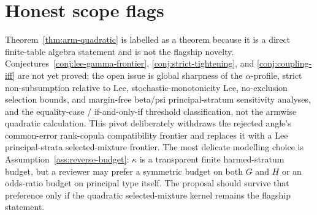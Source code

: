 \documentclass[11pt]{article}
\theoremstyle{definition}
\theoremstyle{plain}
\theoremstyle{remark}
\begin{document}
\section{Honest scope flags}
Theorem~\ref{thm:arm-quadratic} is labelled as a theorem because it is a direct finite-table algebra statement and is not the flagship novelty.  Conjectures~\ref{conj:lee-gamma-frontier}, \ref{conj:strict-tightening}, and \ref{conj:coupling-iff} are not yet proved; the open issue is global sharpness of the \(\alpha\)-profile, strict non-subsumption relative to Lee, stochastic-monotonicity Lee, no-exclusion selection bounds, and margin-free beta/psi principal-stratum sensitivity analyses, and the equality-case / if-and-only-if threshold classification, not the armwise quadratic calculation.  This pivot deliberately withdraws the rejected angle's common-error rank-copula compatibility frontier and replaces it with a Lee principal-strata selected-mixture frontier.  The most delicate modelling choice is Assumption~\ref{ass:reverse-budget}: \(\kappa\) is a transparent finite harmed-stratum budget, but a reviewer may prefer a symmetric budget on both \(G\) and \(H\) or an odds-ratio budget on principal type itself.  The proposal should survive that preference only if the quadratic selected-mixture kernel remains the flagship statement.
\end{document}
